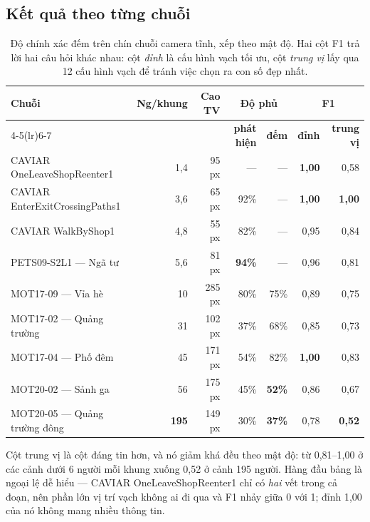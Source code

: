 \subsection{Kết quả theo từng chuỗi}

\begin{table}[H]
\centering
\caption{Độ chính xác đếm trên chín chuỗi camera tĩnh, xếp theo mật độ. Hai cột F1 trả
lời hai câu hỏi khác nhau: cột \emph{đỉnh} là cấu hình vạch tối ưu, cột \emph{trung vị}
lấy qua 12 cấu hình vạch để tránh việc chọn ra con số đẹp nhất.}
\label{tab:mot17}
\small
\begin{tabularx}{\textwidth}{@{}Xrrrrrr@{}}
\toprule
\multirow{2}{*}{\textbf{Chuỗi}} & \multirow{2}{*}{\textbf{Ng/khung}} &
\multirow{2}{*}{\textbf{Cao TV}} & \multicolumn{2}{c}{\textbf{Độ phủ}} &
\multicolumn{2}{c}{\textbf{F1}} \\
\cmidrule(lr){4-5}\cmidrule(lr){6-7}
 & & & \textbf{phát hiện} & \textbf{đếm} & \textbf{đỉnh} & \textbf{trung vị} \\
\midrule
CAVIAR OneLeaveShopReenter1    & \phantom{00}1{,}4 & \phantom{0}95 px & --- & --- & \textbf{1{,}00} & 0{,}58 \\
CAVIAR EnterExitCrossingPaths1 & \phantom{00}3{,}6 & \phantom{0}65 px & 92\% & --- & \textbf{1{,}00} & \textbf{1{,}00} \\
CAVIAR WalkByShop1             & \phantom{00}4{,}8 & \phantom{0}55 px & 82\% & --- & 0{,}95 & 0{,}84 \\
PETS09-S2L1 --- Ngã tư         & \phantom{00}5{,}6 & \phantom{0}81 px & \textbf{94\%} & --- & 0{,}96 & 0{,}81 \\
MOT17-09 --- Vỉa hè            & \phantom{0}10 & 285 px & 80\% & 75\% & 0{,}89 & 0{,}75 \\
MOT17-02 --- Quảng trường      & \phantom{0}31 & 102 px & 37\% & 68\% & 0{,}85 & 0{,}73 \\
MOT17-04 --- Phố đêm           & \phantom{0}45 & 171 px & 54\% & 82\% & \textbf{1{,}00} & 0{,}83 \\
MOT20-02 --- Sảnh ga           & \phantom{0}56 & 175 px & 45\% & \textbf{52\%} & 0{,}86 & 0{,}67 \\
MOT20-05 --- Quảng trường đông & \textbf{195} & 149 px & 30\% & \textbf{37\%} & 0{,}78 & \textbf{0{,}52} \\
\bottomrule
\end{tabularx}
\end{table}

Cột trung vị là cột đáng tin hơn, và nó giảm khá đều theo mật độ: từ 0{,}81--1{,}00 ở
các cảnh dưới 6 người mỗi khung xuống 0{,}52 ở cảnh 195 người. Hàng đầu bảng là ngoại
lệ dễ hiểu --- CAVIAR OneLeaveShopReenter1 chỉ có \emph{hai} vết trong cả đoạn, nên
phần lớn vị trí vạch không ai đi qua và F1 nhảy giữa 0 với 1; đỉnh 1{,}00 của nó không
mang nhiều thông tin.

